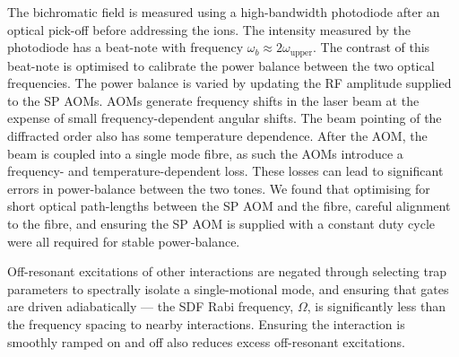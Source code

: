     The bichromatic field is measured using a high-bandwidth photodiode after an optical pick-off before addressing the ions. The intensity measured by the photodiode has a beat-note with frequency $\omega_b \approx 2\omega_\mathrm{upper}$. The contrast of this beat-note is optimised to calibrate the power balance between the two optical frequencies. The power balance is varied by updating the RF amplitude supplied to the SP AOMs.
    AOMs generate frequency shifts in the laser beam at the expense of small
    frequency-dependent angular shifts. The beam pointing of the diffracted order also has some temperature dependence. After the AOM, the beam is coupled into a
    single mode fibre, as such the AOMs introduce a
    frequency- and temperature-dependent loss. These losses can lead to significant errors in power-balance between the two tones. We found that optimising for short optical path-lengths between the SP AOM and the fibre, careful alignment to the fibre, and ensuring the SP AOM is supplied with a constant duty cycle were all required for stable power-balance.

    Off-resonant excitations of other interactions are negated through selecting trap parameters to spectrally isolate a single-motional mode, and ensuring that gates are driven adiabatically --- the SDF Rabi frequency, $\Omega$, is significantly less than the frequency spacing to nearby interactions. Ensuring the interaction is smoothly ramped on and off also reduces excess off-resonant excitations.

